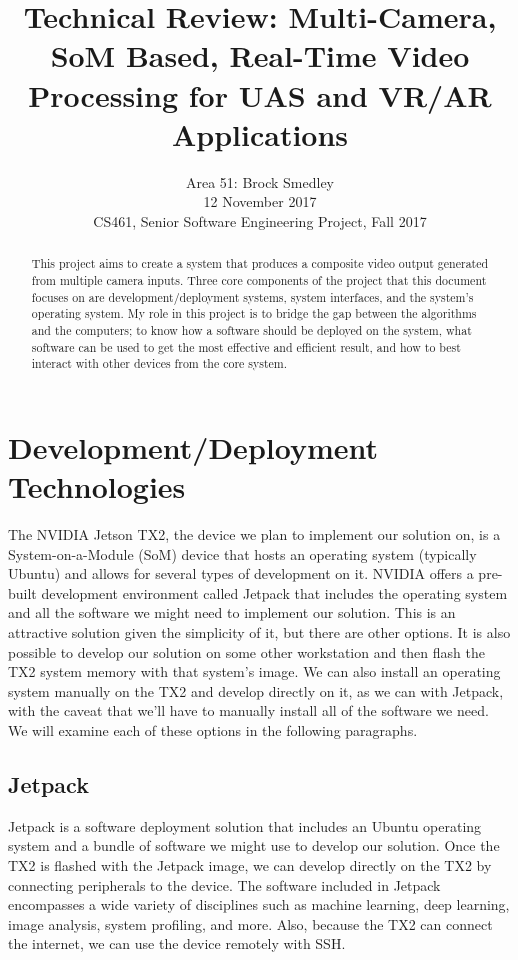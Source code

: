 \documentclass[letterpaper,10pt,serif,draftclsnofoot,onecolumn,compsoc,titlepage]{IEEEtran}
\title{Technical Review: Multi-Camera, SoM Based, Real-Time Video Processing for UAS and VR/AR Applications}
\author{Area 51: Brock Smedley \\ 12 November 2017 \\ CS461, Senior Software Engineering Project, Fall 2017}
\begin{document}
\begin{titlepage}
\maketitle

\begin{abstract}
This project aims to create a system that produces a composite video output generated from multiple camera inputs. Three core components of the project that this document focuses on are development/deployment systems, system interfaces, and the system's operating system. My role in this project is to bridge the gap between the algorithms and the computers; to know how a software should be deployed on the system, what software can be used to get the most effective and efficient result, and how to best interact with other devices from the core system.

\thispagestyle{empty}
\end{abstract}
\end{titlepage}
\newpage


\section{Development/Deployment Technologies}
The NVIDIA Jetson TX2, the device we plan to implement our solution on, is a System-on-a-Module (SoM) device that hosts an operating system (typically Ubuntu) and allows for several types of development on it. NVIDIA offers a pre-built development environment called Jetpack that includes the operating system and all the software we might need to implement our solution. This is an attractive solution given the simplicity of it, but there are other options. It is also possible to develop our solution on some other workstation and then flash the TX2 system memory with that system's image. We can also install an operating system manually on the TX2 and develop directly on it, as we can with Jetpack, with the caveat that we'll have to manually install all of the software we need. We will examine each of these options in the following paragraphs.

\subsection{Jetpack}
Jetpack is a software deployment solution that includes an Ubuntu operating system and a bundle of software we might use to develop our solution. Once the TX2 is flashed with the Jetpack image, we can develop directly on the TX2 by connecting peripherals to the device. The software included in Jetpack encompasses a wide variety of disciplines such as machine learning, deep learning, image analysis, system profiling, and more. Also, because the TX2 can connect the internet, we can use the device remotely with SSH.
\end{document}
